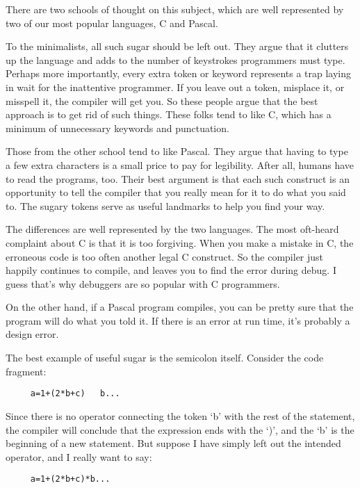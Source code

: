 There are two schools of thought on this subject, which  are well represented by two of our most popular languages, C and Pascal.

To  the minimalists, all such sugar should be  left  out. They argue that it clutters up the language and adds to the  number of keystrokes  programmers  must type. Perhaps  more  importantly, every extra token or keyword represents a trap laying in wait for the inattentive programmer. If you leave out  a  token, misplace it, or misspell it, the compiler  will  get you. So these people argue that the best approach is to get rid of such things. These folks tend to like C, which has a minimum of unnecessary keywords and punctuation.

Those from the other school tend to like Pascal. They argue that having to type a few extra characters is a small price to pay for legibility. After  all, humans have to read the programs, too. Their best argument is that each such construct is an opportunity to tell the compiler that you really mean for it  to  do what you said to. The sugary tokens serve as useful landmarks to help you find your way.

The differences are well represented by the two  languages. The most oft-heard complaint about  C  is  that  it is too forgiving. When you make a mistake in C, the  erroneous  code  is  too often another  legal  C  construct. So  the  compiler  just  happily continues to compile, and  leaves  you  to  find the error during debug. I guess that's why debuggers  are  so  popular  with  C programmers.

On the  other  hand, if  a  Pascal  program compiles, you can be pretty  sure that the program will do what you told it. If there is an error at run time, it's probably a design error.

The  best  example  of  useful  sugar  is  the semicolon  itself. Consider the code fragment:

\begin{verbatim}
     a=1+(2*b+c)   b...
\end{verbatim}

Since there is no operator connecting the token `b' with the rest of the  statement, the compiler will conclude that the expression ends  with  the  `)', and the `b'  is  the  beginning  of  a  new statement. But  suppose  I  have simply left out the  intended operator, and I really want to say:

\begin{verbatim}
     a=1+(2*b+c)*b...
\end{verbatim}

